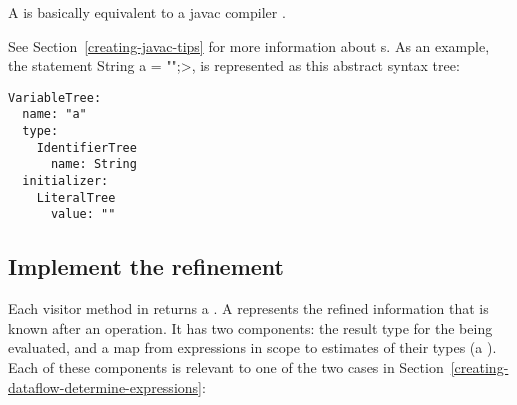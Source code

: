 A 
is basically equivalent to a javac compiler .

See Section~\ref{creating-javac-tips} for more information about s.
As an example, the statement \<String a = "";>, is represented as this
abstract syntax tree:
\begin{Verbatim}
VariableTree:
  name: "a"
  type:
    IdentifierTree
      name: String
  initializer:
    LiteralTree
      value: ""
\end{Verbatim}



\subsection{Implement the refinement\label{creating-dataflow-implement-refinement}}

\begin{sloppypar}
Each visitor method in 
returns a .  A
 represents the
refined information that is known after an operation.  It has two
components:  the result type for the 
being evaluated, and a map from expressions in scope to estimates of their
types (a ).  Each of these components is
relevant to one of the two cases in
Section~\ref{creating-dataflow-determine-expressions}:
\end{sloppypar}

